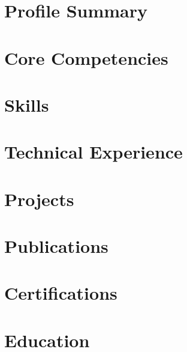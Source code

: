 \documentclass[10pt]{article}
\begin{document}
%  




\section{Profile Summary}


\section{Core Competencies}


\section{Skills}


\section{Technical Experience}


\section{Projects}


\section{Publications}


\section{Certifications}


\section{Education}


\end{document}
